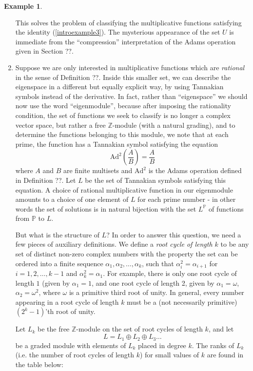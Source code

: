 \documentclass[a4paper]{article}
\theoremstyle{definition}
\newtheorem{example}{Example}[section]
\theoremstyle{remark}
\newcommand{\Z}{\mathbb{Z}}
\newcommand{\bbP}{\mathbb{P}}
\begin{document}
\begin{example}
\begin{enumerate}
This solves the problem of classifying the multiplicative functions satisfying the identity (\ref{introexample3}). The mysterious appearance of the set $U$ is immediate from the ``compression'' interpretation of the Adams operation given in Section ??.


\item Suppose we are only interested in multiplicative functions which are \emph{rational} in the sense of Definition ??. Inside this smaller set, we can describe the eigenspace in a different but equally explicit way, by using Tannakian symbols instead of the derivative. In fact, rather than ``eigenspace'' we should now use the word ``eigenmodule'', because after imposing the rationality condition, the set of functions we seek to classify is no longer a complex vector space, but rather a free $\Z$-module (with a natural grading), and to determine the functions belonging to this module, we note that at each prime, the function has a Tannakian symbol satisfying the equation 
$$   \text{Ad}^2(\frac{A}{B}) = \frac{A}{B}   $$
where $A$ and $B$ are finite multisets and $\text{Ad}^2$ is the Adams operation defined in Definition ??. Let $L$ be the set of Tannakian symbols satisfying this equation. A choice of rational multiplicative function in our eigenmodule amounts to a choice of one element of $L$ for each prime number - in other words the set of solutions is in natural bijection with the set $L^{\bbP}$ of functions from $\bbP$ to $L$. 

But what is the structure of $L$? In order to answer this question, we need a few pieces of auxiliary definitions. We define a \emph{root cycle of length $k$} to be any set of distinct non-zero complex numbers with the property the set can be ordered into a finite sequence $\alpha_1, \alpha_2, \ldots, \alpha_k$, such that $\alpha_i^2 = \alpha_{i+1}$ for $i = 1, 2, \ldots, k-1$ and $\alpha_k^2 = \alpha_1$. For example, there is only one root cycle of length $1$ (given by $\alpha_1 = 1$, and one root cycle of length 2, given by $\alpha_1 = \omega$, $\alpha_2 = \omega^2$, where $\omega$ is a primitive third root of unity. In general, every number appearing in a root cycle of length $k$ must be a (not necessarily primitive) $(2^k-1)$'th root of unity.

 Let $L_k$ be the free $\Z$-module on the set of root cycles of length $k$, and let 
$$  L = L_1 \oplus L_2 \oplus L_3 \ldots   $$
be a graded module with elements of $L_k$ placed in degree $k$. The ranks of $L_k$ (i.e. the number of root cycles of length $k$) for small values of $k$ are found in the table below:


\end{enumerate}
\end{example}
\end{document}
